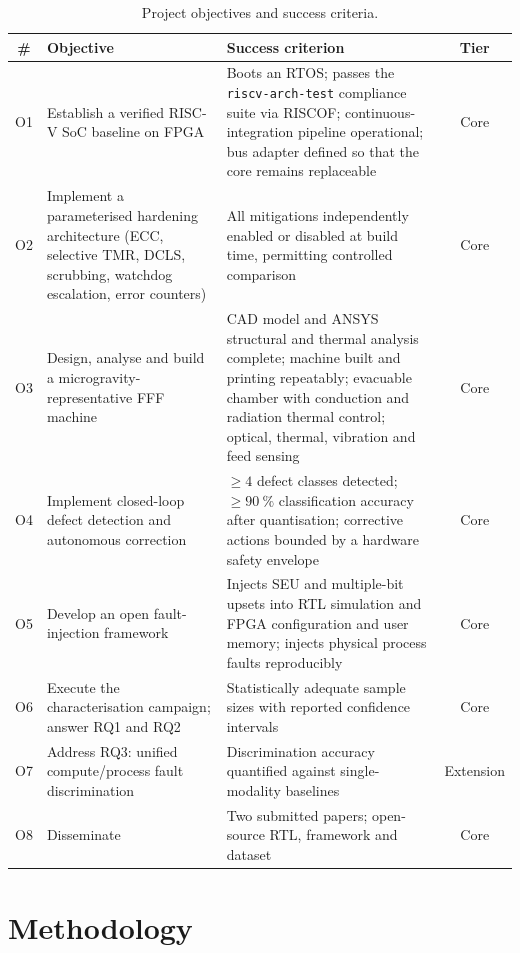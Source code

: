 \documentclass[11pt,a4paper]{article}
\begin{document}
\begin{table}[htbp]
\centering
\caption{Project objectives and success criteria.}
\label{tab:objectives}
\small
\begin{tabularx}{\textwidth}{@{}c L{5.0cm} X c@{}}
\toprule
\textbf{\#} & \textbf{Objective} & \textbf{Success criterion} & \textbf{Tier} \\
\midrule
O1 & Establish a verified RISC-V SoC baseline on FPGA &
Boots an RTOS; passes the \texttt{riscv-arch-test} compliance suite via RISCOF;
continuous-integration pipeline operational; bus adapter defined so that the
core remains replaceable & Core \\
O2 & Implement a parameterised hardening architecture (ECC, selective TMR,
DCLS, scrubbing, watchdog escalation, error counters) &
All mitigations independently enabled or disabled at build time, permitting
controlled comparison & Core \\
O3 & Design, analyse and build a microgravity-representative FFF machine &
CAD model and ANSYS structural and thermal analysis complete; machine built and
printing repeatably; evacuable chamber with conduction and radiation thermal
control; optical, thermal, vibration and feed sensing & Core \\
O4 & Implement closed-loop defect detection and autonomous correction &
\(\geq 4\) defect classes detected; \(\geq \SI{90}{\percent}\) classification
accuracy after quantisation; corrective actions bounded by a hardware safety
envelope & Core \\
O5 & Develop an open fault-injection framework &
Injects SEU and multiple-bit upsets into RTL simulation and FPGA
configuration and user memory; injects physical process faults reproducibly &
Core \\
O6 & Execute the characterisation campaign; answer RQ1 and RQ2 &
Statistically adequate sample sizes with reported confidence intervals & Core \\
O7 & Address RQ3: unified compute/process fault discrimination &
Discrimination accuracy quantified against single-modality baselines &
Extension \\
O8 & Disseminate &
Two submitted papers; open-source RTL, framework and dataset & Core \\
\bottomrule
\end{tabularx}
\end{table}

\section{Methodology}
\end{document}
